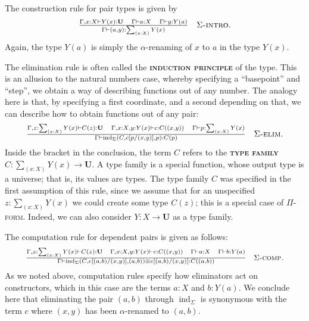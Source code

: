 \documentclass{article}
\newcommand{\defn}[1]{{\scshape\bfseries\color{MPBemph}#1}}
\newcommand{\infrule}[3]{\genfrac{}{}{}{}{#1}{#2}\hspace{1em}{\textsc{#3}}}
\newcommand{\gives}{\vdash}
\newcommand{\U}{\mathbf{U}}
\newcommand{\tsigma}[1]{\sum_{(#1)}}
\DeclareMathOperator{\ind}{ind}
\newcommand{\1}{\textbf{1}}
\newcommand{\0}{\mathbf{0}}
\newcommand{\2}{\textbf{2}}
\begin{document}
The construction rule for pair types is given by
\[ \OD \infrule{\Gamma, x : X \gives Y(x) : \U \hspace{1em} \Gamma \gives a : X \hspace{1em} \Gamma \gives y : Y(a)}{\Gamma \gives (a, y) : \tsigma{x : X} Y(x)}{\( \Sigma \)-intro}. \]
Again, the type \( Y(a) \) is simply the \( \alpha \)-renaming of \( x \) to \( a \) in the type \( Y(x) \).

The elimination rule is often called the \defn{induction principle} of the type. This is an allusion to the natural numbers case, whereby specifying a ``basepoint'' and ``step'', we obtain a way of describing functions out of any number. The analogy here is that, by specifying a first coordinate, and a second depending on that, we can describe how to obtain functions out of any pair:
\[ \OD \infrule{\Gamma, z : \tsigma{x : X} Y(x) \gives C(z) : \U \hspace{1em} \Gamma, x : X, y : Y(x) \gives c : C((x, y)) \hspace{1em} \Gamma \gives p : \tsigma{x : X} Y(x)}{\Gamma \gives \ind_{\Sigma}(C, c[p/(x, y)], p) : C(p)}{\( \Sigma \)-elim}. \]
Inside the bracket in the conclusion, the term \( C \) refers to the \defn{type family} \( C : \tsigma{x : X} Y(x) \to \U \). A type family is a special function, whose output type is a universe; that is, its values are types. The type family \( C \) was specified in the first assumption of this rule, since we assume that for an unspecified \( z : \tsigma{x : X} Y(x) \) we could create some type \( C(z) \); this is a special case of \textsc{\( \Pi \)-form}. Indeed, we can also consider \( Y : X \to \U \) as a type family.

The computation rule for dependent pairs is given as follows:
\[ \OD {\small\infrule{\Gamma, z : \tsigma{x : X} Y(x) \gives C(z) : \U \hspace{1em} \Gamma, x : X, y : Y(x) \gives c : C((x, y)) \hspace{1em} \Gamma \gives a : X \hspace{1em} \Gamma \gives b : Y(a)}{\Gamma \gives \ind_{\Sigma}(C, c[(a, b)/(x, y)], (a, b)) \equiv c[(a, b)/(x, y)] : C((a, b))}{\( \Sigma \)-comp}}. \]
As we noted above, computation rules specify how eliminators act on constructors, which in this case are the terms \( a : X \) and \( b : Y(a) \). We conclude here that eliminating the pair \( (a, b) \) through \( \ind_{\Sigma} \) is synonymous with the term \( c \) where \( (x, y) \) has been \( \alpha \)-renamed to \( (a, b) \).
\end{document}
